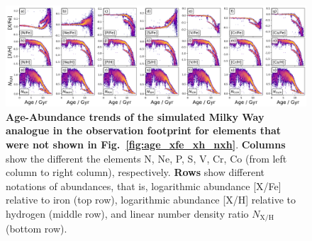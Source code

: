 \documentclass[fleqn,usenatbib]{mnras}
\begin{document}
\begin{figure}
	\includegraphics[width=\textwidth]{figures/age_xfe_xh_nxh_others.png}
    \caption{
    \textbf{Age-Abundance trends of the simulated Milky Way analogue in the observation footprint for elements that were not shown in Fig.~\ref{fig:age_xfe_xh_nxh}}.
    \textbf{Columns} show the different the elements N, Ne, P, S, V, Cr, Co (from left column to right column), respectively.
    \textbf{Rows} show different notations of abundances, that is, logarithmic abundance {[X/Fe]} relative to iron (top row), logarithmic abundance {[X/H]} relative to hydrogen (middle row), and linear number density ratio {$N_\mathrm{X/H}$} (bottom row).
    }
    \label{fig:appendix_xfe_xh_nx}
\end{figure}


\bsp	%
\label{lastpage}
\end{document}
